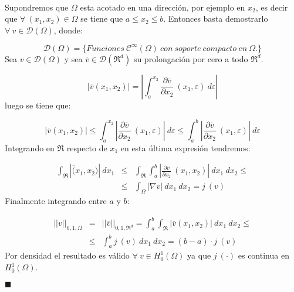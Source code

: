 \begin{demoslema}
\ \\
Supondremos que $\Omega $ esta acotado en una direcci\'on, por ejemplo en 
$x_2$, es decir que $\forall \ (x_1,x_2)\in \Omega$ se tiene que
$a\le x_2\le b$. Entonces basta demostrarlo $\forall \ v \in
\mathcal{D}(\Omega)$, donde:

\begin{displaymath}
\mathcal{D}(\Omega )=\{Funciones\ \mathcal{C}^{\infty}(\Omega )\ con\ soporte\
compacto\ en\ \Omega .\}
\end{displaymath}
Sea $v\in \mathcal{D}(\Omega )$ y sea $\overline{v}\in \mathcal{D}(\Re ^d)$ su
prolongaci\'on por cero a todo $\Re ^d$.

\begin{displaymath}
|\overline{v}(x_1,x_2)| = |\int_a^{x_2} \frac{\partial \overline{v}}
{\partial x_2}\ (x_1,\varepsilon)\ d\varepsilon|
\end{displaymath}
luego se tiene que:

\begin{displaymath}
|\overline{v}(x_1,x_2)|\le \int_a^{x_2}|\frac{\partial \overline{v}}
{\partial x_2}\ (x_1,\varepsilon)|\ d\varepsilon \le \int_a^b 
|\frac{\partial \overline{v}}{\partial x_2}\ (x_1,\varepsilon) |\ d\varepsilon
\end{displaymath}
Integrando en $\Re$ respecto de $x_1$ en esta \'ultima expresi\'on tendremos:

\begin{eqnarray*}
\int_{\Re} |\overline(x_1,x_2)|\ dx_1&\le& \int_{\Re} \int_a^b 
|\frac{\partial \overline{v}}{\partial x_2}\ (x_1,x_2)|\ dx_1\ dx_2\le \\
&\le &\int_{\Omega }|\nabla v|\ dx_1\ dx_2 = j\ (v)
\end{eqnarray*}
Finalmente integrando entre $a$ y $b$:

\begin{eqnarray*}
||v||_{0,1,\Omega }&=& ||\overline{v}||_{0,1,\Re^d} =\int_a^b \int_{\Re}
|\overline{v} (x_1,x_2)|\ dx_1\ dx_2\le \\
&\le & \int_a^bj\ (v)\ dx_1\ dx_2 = (b-a)\cdot j\ (v)
\end{eqnarray*}
Por densidad el resultado es v\'alido $\forall \ v \in H^1_0(\Omega )$ ya que
$j\ (\cdot )$ es continua en $H^1_0(\Omega )$.

\begin{flushright}
$\blacksquare$
\end{flushright}
\end{demoslema}

